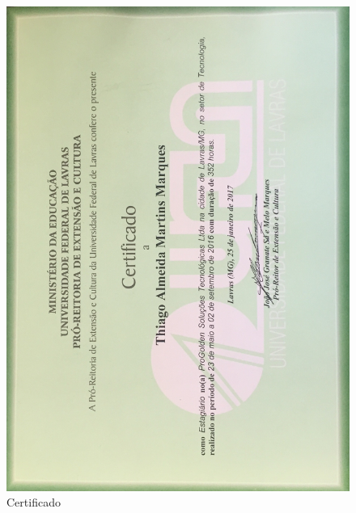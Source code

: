 \label{cap:certificado}

\begin{figure}[H]
\centering
\includegraphics[width=1\textwidth]{images/certificado.JPG}
\caption{Certificado}
\label{fig:mockup1}
\end{figure}